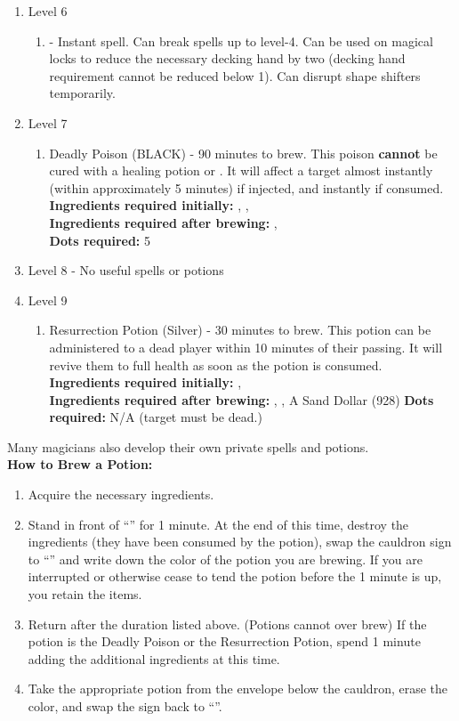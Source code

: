 \documentclass[green]{NeptuneBall}
\begin{document}
\begin{enumerate}
   \item Level 6
    \begin{enumerate}
      \item \aGreaterDispel{} - Instant spell. Can break spells up to level-4. Can be used on magical locks to reduce the necessary decking hand by two (decking hand requirement cannot be reduced below 1). Can disrupt shape shifters temporarily.
    \end{enumerate}
   \item Level 7
    \begin{enumerate}
      \item Deadly Poison (BLACK) - 90 minutes to brew. This poison {\bf cannot} be cured with a healing potion or \aFirstAid{}. It will affect a target almost instantly (within approximately 5 minutes) if injected, and instantly if consumed.\\
      {\bf Ingredients required initially:} \iIceFish{}, \iElectricEel{}, \iSwordfish{}\\
      {\bf Ingredients required after brewing:} \iSnails{}, \iDeepClam{}\\
		  {\bf Dots required:} 5
    \end{enumerate}
   \item Level 8 - No useful spells or potions
   \item Level 9
   	\begin{enumerate}
   	 \item Resurrection Potion (Silver) - 30 minutes to brew. This potion can be administered to a dead player within 10 minutes of their passing. It will revive them to full health as soon as the potion is consumed.\\
   	 {\bf Ingredients required initially:} \iSnails{}, \iPearl{}\\
   	 {\bf Ingredients required after brewing:} \iDrug{}, \iAnglerFish{}, A Sand Dollar (928)
   	 {\bf Dots required:} N/A (target must be dead.)
   	\end{enumerate}
\end{enumerate}
Many magicians also develop their own private spells and potions. \\

{\bf How to Brew a Potion:}
\begin{enumerate}
  \item Acquire the necessary ingredients.
  \item Stand in front of ``\sEmptyCauldron{}'' for 1 minute. At the end of this time, destroy the ingredients (they have been consumed by the potion), swap the cauldron sign to ``\sFullCauldron{}'' and write down the color of the potion you are brewing. If you are interrupted or otherwise cease to tend the potion before the 1 minute is up, you retain the items.
  \item Return after the duration listed above. (Potions cannot over brew) If the potion is the Deadly Poison or the Resurrection Potion, spend 1 minute adding the additional ingredients at this time.
  \item Take the appropriate potion from the envelope below the cauldron, erase the color, and swap the sign back to ``\sEmptyCauldron{}''.
\end{enumerate}
\end{document}
